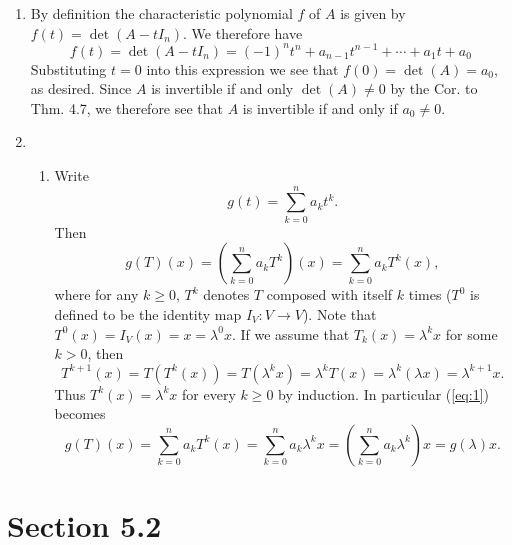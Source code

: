 \documentclass[12pt]{article}
\begin{document}
\begin{enumerate}
\begin{enumerate}
\begin{enumerate}[label=(\roman*)]
\end{enumerate}

\end{enumerate}
\setcounter{enumi}{19}
\item
By definition the characteristic polynomial $f$ of $A$ is given by $f(t) = \det(A - tI_n)$. We therefore have
\begin{equation*}
f(t) = \det(A - tI_n) = (-1)^n t^n +a_{n-1} t^{n-1} + \cdots + a_1 t + a_0
\end{equation*}
Substituting $t = 0$ into this expression we see that $f(0) = \det(A) = a_0$, as desired. Since $A$ is invertible if and only $\det(A) \neq 0$ by the Cor. to Thm. 4.7, we therefore see that $A$ is invertible if and only if $a_0 \neq 0$.

\setcounter{enumi}{21}
\item
\begin{enumerate}
\item
Write
\begin{equation*}
g(t) = \sum_{k=0}^n a_k t^k.
\end{equation*}
Then
\begin{equation} \label{eq:1}
g(T)(x) = \left(\sum_{k=0}^n a_k T^k\right)(x) = \sum_{k=0}^n a_k T^k(x),
\end{equation}
where for any $k \geq 0$, $T^k$ denotes $T$ composed with itself $k$ times ($T^0$ is defined to be the identity map $I_V : V \to V$). Note that $T^0(x) = I_V(x) = x = \lambda^0 x$. If we assume that $T_k(x) = \lambda^k x$ for some $k > 0$, then
\begin{equation*}
T^{k+1}(x) = T(T^k(x)) = T(\lambda^k x) = \lambda^k T(x) = \lambda^k (\lambda x) = \lambda^{k+1} x.
\end{equation*}
Thus $T^k(x) = \lambda^k x$ for every $k \geq 0$ by induction. In particular (\ref{eq:1}) becomes
\begin{equation*}
g(T)(x) = \sum_{k=0}^n a_k T^k(x) = \sum_{k=0}^n a_k \lambda^k x = \left(\sum_{k=0}^n a_k \lambda^k\right) x = g(\lambda) x.
\end{equation*}

\end{enumerate}

\setcounter{enumi}{21}

\end{enumerate}

\section*{Section 5.2}
\end{document}
